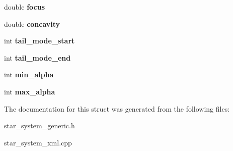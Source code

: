 \begin{DoxyCompactItemize}
\item 
double {\bfseries focus}\hypertarget{structAtmosphericFogMesh_a3bf0e3e5c6ee609fcc4453e017c244c1}{}\label{structAtmosphericFogMesh_a3bf0e3e5c6ee609fcc4453e017c244c1}

\item 
double {\bfseries concavity}\hypertarget{structAtmosphericFogMesh_a0b414385243f72174d1f992caf6cc40b}{}\label{structAtmosphericFogMesh_a0b414385243f72174d1f992caf6cc40b}

\item 
int {\bfseries tail\+\_\+mode\+\_\+start}\hypertarget{structAtmosphericFogMesh_ac957f0639f5005e269d064ae73b98add}{}\label{structAtmosphericFogMesh_ac957f0639f5005e269d064ae73b98add}

\item 
int {\bfseries tail\+\_\+mode\+\_\+end}\hypertarget{structAtmosphericFogMesh_a4aa433d51511e662dff6ffad7c369700}{}\label{structAtmosphericFogMesh_a4aa433d51511e662dff6ffad7c369700}

\item 
int {\bfseries min\+\_\+alpha}\hypertarget{structAtmosphericFogMesh_a7d929f95873755ef511b54d58a4aee6c}{}\label{structAtmosphericFogMesh_a7d929f95873755ef511b54d58a4aee6c}

\item 
int {\bfseries max\+\_\+alpha}\hypertarget{structAtmosphericFogMesh_ae4909e6b66ea1174cbf1078310839dc7}{}\label{structAtmosphericFogMesh_ae4909e6b66ea1174cbf1078310839dc7}

\end{DoxyCompactItemize}


The documentation for this struct was generated from the following files\+:\begin{DoxyCompactItemize}
\item 
star\+\_\+system\+\_\+generic.\+h\item 
star\+\_\+system\+\_\+xml.\+cpp\end{DoxyCompactItemize}
